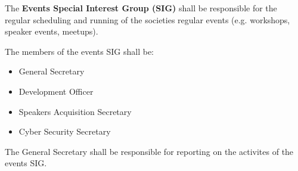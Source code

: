 \begin{clause}
    The \textbf{Events Special Interest Group (SIG)} shall be responsible for the regular scheduling and running of the societies regular events (e.g. workshops, speaker events, meetups).
\end{clause}

\begin{subclause}
    The members of the events SIG shall be:
    \begin{itemize}
        \item General Secretary
        \item Development Officer
        \item Speakers Acquisition Secretary
        \item Cyber Security Secretary
    \end{itemize}
\end{subclause}

\begin{subclause}
    The General Secretary shall be responsible for reporting on the activites of the events SIG.
\end{subclause}